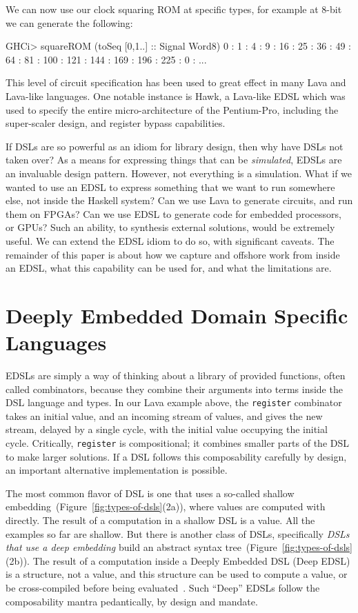 \documentclass[11pt]{article}
\begin{document}
We can now use our clock squaring ROM at specific types,
for example at 8-bit we can generate the following:
\begin{Code}
GHCi> squareROM (toSeq [0,1..] :: Signal Word8)        
0 : 1 : 4 : 9 : 16 : 25 : 36 : 49 : 64 : 81 : 100 : 121 : 144 : 169 : 196 : 225 : 0 : ...
\end{Code}

This level of circuit specification has been used to great
effect in many Lava and Lava-like languages. One notable
instance is Hawk, a Lava-like EDSL which was used to specify
the entire micro-architecture of the Pentium-Pro, including the
super-scaler design, and register bypass capabilities.

If DSLs are so powerful as an idiom for library design, then why have DSLs not taken over?
As a means for expressing things that can be {\em simulated\/}, EDSLs are an invaluable
design pattern. 
However, not everything is a simulation. What if we wanted to use an EDSL to express
something that we want to run somewhere else, not inside the Haskell system?
Can we use Lava to generate circuits, and run them on FPGAs? Can we use EDSL
to generate code for embedded processors, or GPUs? Such an ability, to 
synthesis external solutions, would be extremely useful. We can extend
the EDSL idiom to do so, with significant caveats. The remainder of this
paper is about how we capture and offshore work from inside an EDSL, what
this capability can be used for, and what the limitations are.

\section{Deeply Embedded Domain Specific Languages}

EDSLs are simply a way of thinking about a library
of provided functions, often called combinators, because they combine
their arguments into terms inside the DSL language and types. In our
Lava example above, the \verb|register| combinator takes an initial
value, and an incoming stream of values, and gives the new stream,
delayed by a single cycle, with the initial value occupying the initial
cycle. Critically, \verb|register| is compositional; it combines
smaller parts of the DSL to make larger solutions. If a DSL
follows this composability carefully by design, an important alternative implementation
is possible.

The most common flavor of DSL is one  that uses a so-called shallow embedding~(Figure~\ref{fig:types-of-dsls}(2a)), where values are computed with directly.
The result of a computation in a shallow DSL is a value. All the examples so far are shallow.
But there is another class of DSLs, 
specifically {\em DSLs that use a deep embedding\/} build an abstract syntax tree~(Figure~\ref{fig:types-of-dsls}(2b)).
The result of a computation inside a Deeply Embedded DSL (Deep EDSL)
is a structure, not a value, and this structure can be used to compute a value,
or be cross-compiled before being evaluated~\cite{Elliott:03:CompileDSEL-JFP}. Such ``Deep'' EDSLs
follow the composability mantra pedantically, by design and mandate.
\end{document}
